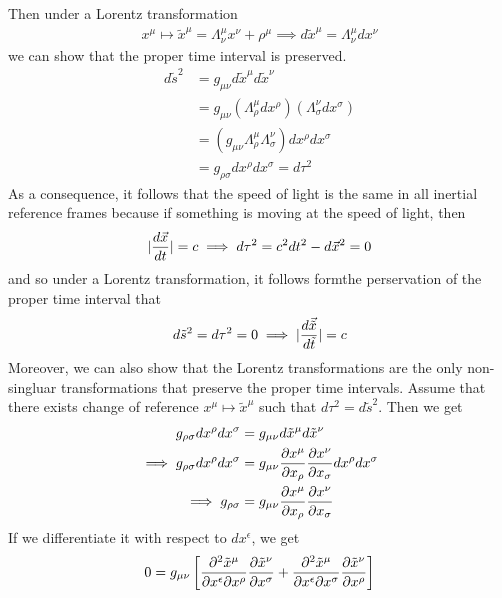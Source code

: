 Then under a Lorentz transformation
\begin{align*}
  x^{\mu} \mapsto \tilde{x}^{\mu} = \Lambda_{\nu}^{\mu}x^{\nu} + \rho^{\mu} \implies d \tilde{x}^{\mu} = \Lambda_{\nu}^{\mu}dx^{\nu}
\end{align*}
we can show that the proper time interval is preserved.
\begin{align*}
  d \tilde{s}^{2} 
  &= g_{\mu\nu}d \tilde{x}^{\mu}d \tilde{x}^{\nu}\\
  &= g_{\mu\nu}\left(
    \Lambda_{\rho}^{\mu}dx^{\rho}
  \right)\left(
    \Lambda_{\sigma}^{\nu}dx^{\sigma}
  \right)\\
  &= \left(
    g_{\mu\nu} \Lambda_{\rho}^{\mu}\Lambda_{\sigma}^{\nu}
  \right)
  dx^{\rho}dx^{\sigma}\\
  &= g_{\rho \sigma}dx^{\rho}dx^{\sigma} = d\tau^{2}
\end{align*}
As a consequence, it follows that the speed of light is the same in all inertial reference frames because if something is moving at the speed of light, then
\begin{align*}
  \vert\frac{d \vec{x}}{d t}\vert = c \implies d\tau^{2} = c^{2} dt^{2} - d \vec{x}^{2} = 0
\end{align*}
and so under a Lorentz transformation, it follows formthe perservation of the proper time interval that 
\begin{align*}
d \tilde{s}^{2} = d\tau^{2} = 0 \implies \vert\frac{d \vec{\tilde{x}}}{d \tilde{t}}\vert = c
\end{align*}
Moreover, we can also show that the Lorentz transformations are the only non-singluar transformations that preserve the proper time intervals.
Assume that there exists change of reference $x^{\mu} \mapsto \tilde{x}^{\mu}$ such that $d\tau^{2} = d \tilde{s}^{2}$.
Then we get
\begin{align*}
  g_{\rho \sigma}dx^{\rho}dx^{\sigma} 
  &= 
  g_{\mu\nu} d \tilde{x}^{\mu}d \tilde{x}^{\nu}\\
  \implies g_{\rho \sigma}dx^{\rho}dx^{\sigma} 
  &=
  g_{\mu\nu} \frac{\partial x^{\mu}}{\partial x_{\rho}}\frac{\partial x^{\nu}}{\partial x_{\sigma}}dx^{\rho}dx^{\sigma}\\
  \implies
  g_{\rho \sigma} 
  &= g_{\mu\nu}\frac{\partial x^{\mu}}{\partial x_{\rho}}\frac{\partial x^{\nu}}{\partial x_{\sigma}}
\end{align*}
If we differentiate it with respect to $dx^{\epsilon}$, we get
\begin{align*}
  0 = g_{\mu\nu} \left[\frac{\partial^{2}\tilde{x}^{\mu}}{\partial x^{\epsilon}\partial x^{\rho}} \frac{\partial \tilde{x}^{\nu}}{\partial x^{\sigma}} + \frac{\partial^{2}\tilde{x}^{\mu}}{\partial x^{\epsilon}\partial x^{\sigma}} \frac{\partial \tilde{x}^{\nu}}{\partial x^{\rho}}\right]
\end{align*}
